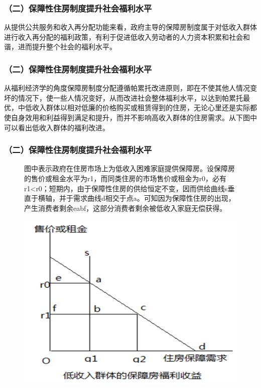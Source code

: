\documentclass[aspectratio=169, 12pt]{beamer}
\begin{document}
\begin{frame}[plain]
    \frametitle{（二）保障性住房制度提升社会福利水平}
    从提供公共服务和收入再分配功能来看，政府主导的保障房制度属于对低收入群体进行收入再分配的福利政策，有利于促进低收入劳动者的人力资本积累和社会和谐，进而提升整个社会的福利水平。
\end{frame}

\begin{frame}[plain]
    \frametitle{（二）保障性住房制度提升社会福利水平}
    从福利经济学的角度保障房制度分配遵循帕累托改进原则，即在不使其他人情况变坏的情况下，使一些人情况变好，从而改进社会整体福利水平，以达到帕累托最优，中低收入群体以相对低廉的价格购买或租赁得到的住房，无论心里还是实际都使自身效用和利益得到满足和提升，而并不影响高收入群体的住房需求。从下图中可以看出低收入群体的福利改进。
\end{frame}

\begin{frame}[plain]
    \frametitle{（二）保障性住房制度提升社会福利水平}
    \begin{figure}[]
        \centering
        \begin{minipage}{0.4\linewidth}
            图中表示政府在住房市场上为低收入困难家庭提供保障房。设保障房的售价或租金水平为r1，而同类住房的市场售价或租金为r0，必有r1<r0；短期内，由于保障性住房的供给恒定不变，因而供给曲线s垂直于横轴，并于需求曲线d相交于点a。可知因为保障性住房的出现，产生消费者剩余eabf，这部分消费者剩余被低收入家庭无偿获得。
        \end{minipage}%
        \begin{minipage}{0.6\linewidth}
            \centering
            \includegraphics[width=1.0\textwidth]{./resources/figure/renthouse.png}
        \end{minipage}
        \end{figure}
\end{frame}
\end{document}
